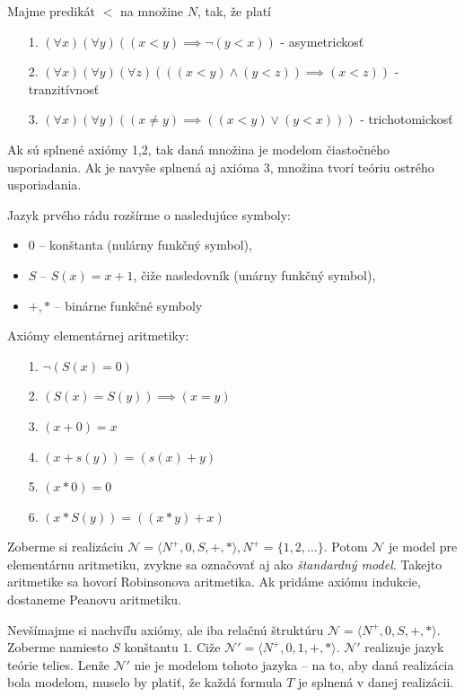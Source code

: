 \begin{priklad}
    Majme predikát $<$ na množine $N$, tak, že platí
    \begin{itemize}
    \item[1.] $(\forall x)(\forall y) ((x < y) \implies \neg (y < x))$
    - asymetrickosť
    \item[2.] $(\forall x)(\forall y)(\forall z) (((x<y) \land (y<z)) \implies
        (x<z))$ - tranzitívnosť
    \item[3.] $(\forall x)(\forall y)( (x\not=y) \implies ((x<y) \lor (y<x)))$ -
     trichotomickosť
    \end{itemize}
    Ak sú splnené axiómy 1,2, tak daná množina je modelom čiastočného
    usporiadania. Ak je
    navyše splnená aj axióma 3, množina tvorí teóriu ostrého
    usporiadania.
\end{priklad}

\begin{priklad}
    Jazyk prvého rádu rozšírme o nasledujúce symboly:
    \begin{itemize}
        \item $0$ -- konštanta (nulárny funkčný symbol),
        \item $S$ -- $S(x)=x+1$, čiže nasledovník (unárny funkčný symbol),
        \item $+,*$ -- binárne funkčné symboly
    \end{itemize}
    Axiómy elementárnej aritmetiky:
    \begin{itemize}
        \item[1.] $\neg (S(x) = 0)$
        \item[2.] $(S(x) = S(y)) \implies (x=y)$
        \item[3.] $(x+0) = x$
        \item[4.] $(x+s(y)) = (s(x) + y)$
        \item[5.] $(x * 0) = 0$
        \item[6.] $(x * S(y)) = ((x*y)+x)$
    \end{itemize}
    Zoberme si realizáciu 
        $\mathcal{N}=\langle N^+,0,S,+,* \rangle, N^+ =
        \{1,2,\dots\}$.
        Potom $\mathcal{N}$ je model pre elementárnu aritmetiku,
        zvykne sa označovať aj ako \emph{štandardný model}.
        Takejto aritmetike sa hovorí Robinsonova aritmetika.
        Ak pridáme axiómu indukcie, dostaneme Peanovu aritmetiku.
\end{priklad}

\startFIXME
\begin{poznamka}
    Nevšímajme si nachvíľu axiómy, ale iba relačnú štruktúru
    $\mathcal{N}=\langle N^+,0,S,+,* \rangle$.
    Zoberme namiesto $S$ konštantu $1$.
    Ciže $\mathcal{N}'=\langle N^+,0,1,+,* \rangle$.
    $\mathcal{N}'$ realizuje jazyk teórie telies.
    Lenže $\mathcal{N}'$ nie je modelom tohoto jazyka --
    na to, aby daná realizácia bola modelom, muselo by platiť, že
    každá formula $T$ je splnená v danej realizácii.
\end{poznamka}

